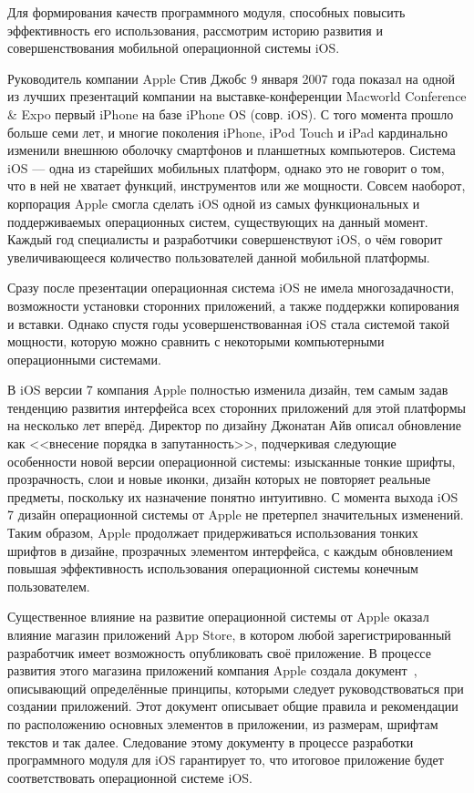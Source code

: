 Для формирования качеств программного модуля, способных повысить эффективность его
использования, рассмотрим историю развития и совершенствования мобильной
операционной системы iOS.

Руководитель компании Apple Стив Джобс 9 января 2007 года показал на одной
из лучших презентаций компании на выставке-конференции
Macworld Conference \& Expo первый iPhone на базе iPhone OS (совр. iOS).
С того момента прошло больше семи лет, и многие поколения iPhone, iPod Touch и iPad
кардинально изменили внешнюю оболочку смартфонов и планшетных компьютеров.
Система iOS --- одна из старейших мобильных платформ, однако это не говорит о том,
что в ней не хватает функций, инструментов или же мощности.
Совсем наоборот, корпорация Apple смогла сделать iOS одной из самых функциональных
и поддерживаемых операционных систем, существующих на данный момент.
Каждый год специалисты и разработчики совершенствуют iOS,
о чём говорит увеличивающееся количество пользователей данной мобильной платформы.

Сразу после презентации операционная система iOS не имела многозадачности,
возможности установки сторонних приложений, а также поддержки копирования и вставки.
Однако спустя годы усовершенствованная iOS стала системой такой мощности,
которую можно сравнить с некоторыми компьютерными операционными системами.

В iOS версии 7 компания Apple полностью изменила дизайн,
тем самым задав тенденцию развития интерфейса всех сторонних приложений для этой
платформы на несколько лет вперёд. Директор по дизайну Джонатан Айв описал
обновление как <<внесение порядка в запутанность>>, подчеркивая следующие
особенности новой версии операционной системы: изысканные тонкие шрифты,
прозрачность, слои и новые иконки, дизайн которых не повторяет реальные предметы,
поскольку их назначение понятно интуитивно.
С момента выхода iOS 7 дизайн операционной системы от Apple не претерпел
значительных изменений. Таким образом, Apple продолжает придерживаться
использования тонких шрифтов в дизайне, прозрачных элементом интерфейса,
с каждым обновлением повышая эффективность использования операционной
системы конечным пользователем.

Существенное влияние на развитие операционной
системы от Apple оказал влияние магазин приложений App Store, в котором
любой зарегистрированный разработчик имеет возможность опубликовать своё
приложение. В процессе развития этого магазина приложений компания Apple
создала документ~\cite{ios_hig}, описывающий определённые принципы, которыми следует
руководствоваться при создании приложений. Этот документ описывает общие
правила и рекомендации по расположению основных элементов в приложении,
из размерам, шрифтам текстов и так далее.
Следование этому документу в процессе разработки программного модуля для iOS
гарантирует то, что итоговое приложение будет соответствовать
операционной системе iOS.

